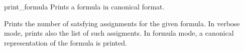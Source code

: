 \begin{nusmvCommand} {print\_formula} {Prints a formula in canonical format.}


Prints the number of satsfying assignments for the given formula. In
verbose mode, prints also the list of such assigments. In formula
mode, a canonical representation of the formula is printed.

\begin{cmdOpt}
\end{cmdOpt}



\end{nusmvCommand}
